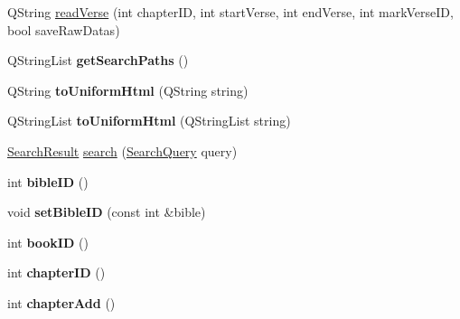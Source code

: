 \begin{DoxyCompactItemize}
\item 
QString \hyperlink{classBible_a515418999329333e8a6a821fc88d006f}{readVerse} (int chapterID, int startVerse, int endVerse, int markVerseID, bool saveRawDatas)
\item 
\hypertarget{classBible_a21a6808e0663d2f99604e137184b2b4d}{
QStringList {\bfseries getSearchPaths} ()}
\label{classBible_a21a6808e0663d2f99604e137184b2b4d}

\item 
\hypertarget{classBible_a2fe743ec79eae111c903a5b0ccfa17c9}{
QString {\bfseries toUniformHtml} (QString string)}
\label{classBible_a2fe743ec79eae111c903a5b0ccfa17c9}

\item 
\hypertarget{classBible_ab279b2e604ad7b2d445235e1302686b7}{
QStringList {\bfseries toUniformHtml} (QStringList string)}
\label{classBible_ab279b2e604ad7b2d445235e1302686b7}

\item 
\hyperlink{classSearchResult}{SearchResult} \hyperlink{classBible_a33103e25381494250b9a351572bb4e8e}{search} (\hyperlink{classSearchQuery}{SearchQuery} query)
\item 
\hypertarget{classBible_a6aeeae4c261ff3a40b28e671bed19c2d}{
int {\bfseries bibleID} ()}
\label{classBible_a6aeeae4c261ff3a40b28e671bed19c2d}

\item 
\hypertarget{classBible_a563553694b582275599e95e81ea0b3de}{
void {\bfseries setBibleID} (const int \&bible)}
\label{classBible_a563553694b582275599e95e81ea0b3de}

\item 
\hypertarget{classBible_a2df47f1e4ba133d041f458d4cf2ce6c1}{
int {\bfseries bookID} ()}
\label{classBible_a2df47f1e4ba133d041f458d4cf2ce6c1}

\item 
\hypertarget{classBible_a161d0777d83b94f31df05d32e77d76bb}{
int {\bfseries chapterID} ()}
\label{classBible_a161d0777d83b94f31df05d32e77d76bb}

\item 
\hypertarget{classBible_a7559212b56e1c9ca36f19a202c90f030}{
int {\bfseries chapterAdd} ()}
\label{classBible_a7559212b56e1c9ca36f19a202c90f030}

\end{DoxyCompactItemize}
